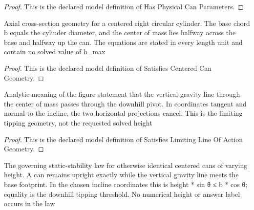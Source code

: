 \begin{proof}
  This is the declared model definition of Has Physical Can Parameters.
\end{proof}
\begin{definition}
  \label{def:physics:phyx-mini-0710:phyxminiproblems-problemphyxmini0710-satisfiescenteredcangeometry}
  Axial cross-section geometry for a centered right circular cylinder. The base chord b equals the cylinder diameter, and the center of mass lies halfway across the base and halfway up the can. The equations are stated in every length unit and contain no solved value of h\_max
\end{definition}
\begin{proof}
  This is the declared model definition of Satisfies Centered Can Geometry.
\end{proof}
\begin{definition}
  \label{def:physics:phyx-mini-0710:phyxminiproblems-problemphyxmini0710-satisfieslimitinglineofactiongeometry}
  Analytic meaning of the figure statement that the vertical gravity line through the center of mass passes through the downhill pivot. In coordinates tangent and normal to the incline, the two horizontal projections cancel. This is the limiting tipping geometry, not the requested solved height
\end{definition}
\begin{proof}
  This is the declared model definition of Satisfies Limiting Line Of Action Geometry.
\end{proof}
\begin{definition}
  \label{def:physics:phyx-mini-0710:phyxminiproblems-problemphyxmini0710-satisfiesstaticstabilitylaw}
  The governing static-stability law for otherwise identical centered cans of varying height. A can remains upright exactly while the vertical gravity line meets the base footprint. In the chosen incline coordinates this is height * sin θ ≤ b * cos θ; equality is the downhill tipping threshold. No numerical height or answer label occurs in the law
\end{definition}

